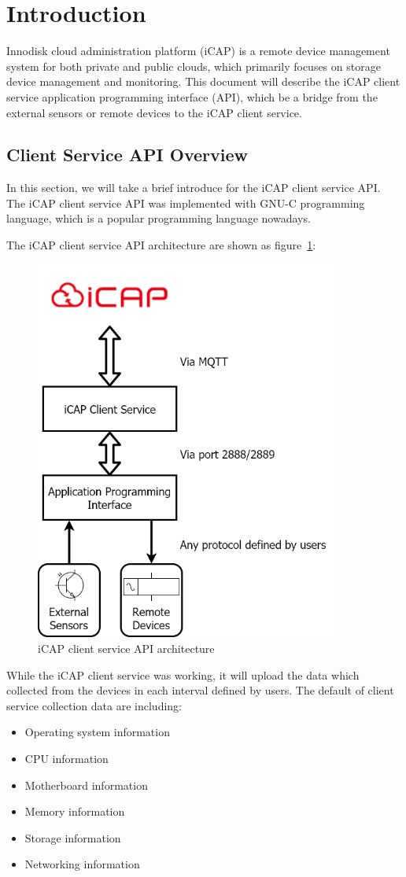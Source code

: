 \section{Introduction}
Innodisk cloud administration platform (iCAP) is a remote device management system for both private and public clouds, which primarily focuses on storage device management and monitoring.
This document will describe the iCAP client service application programming interface (API), which be a bridge from the external sensors or remote devices to the iCAP client service.

\subsection{Client Service API Overview}
In this section, we will take a brief introduce for the iCAP client service API.
The iCAP client service API was implemented with GNU-C programming language, which is a popular programming language nowadays.

The iCAP client service API architecture are shown as figure~\ref{fig:apiarch}:
	\begin{figure}[H]
		\centering
		\includegraphics[width=10cm]{pic/apiarch}
		\caption{iCAP client service API architecture \label{fig:apiarch}}
	\end{figure}
While the iCAP client service was working, it will upload the data which collected from the devices in each interval defined by users.
The default of client service collection data are including:
\begin{itemize}
	\item Operating system information
	\item CPU information
	\item Motherboard information
	\item Memory information
	\item Storage information
	\item Networking information
\end{itemize}

